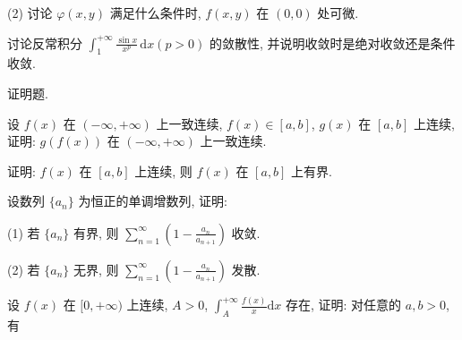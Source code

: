 (2) 讨论 $\varphi(x, y)$ 满足什么条件时, $f(x, y)$ 在 $(0, 0)$ 处可微.\par
讨论反常积分 $\int_{1}^{+\infty} \frac{\sin x}{x^p} \, \mathrm{d}x (p > 0)$ 的敛散性, 并说明收敛时是绝对收敛还是条件收敛.\par
\par{}
证明题.\par
设 $f(x)$ 在 $(- \infty, +\infty)$ 上一致连续, $f(x) \in [a, b]$, $g(x)$ 在 $[a, b]$ 上连续, 证明: $g(f(x))$ 在 $(- \infty, +\infty)$ 上一致连续.\par
证明: $f(x)$ 在 $[a, b]$ 上连续, 则 $f(x)$ 在 $[a, b]$ 上有界.\par
设数列 $\{a_{n}\}$ 为恒正的单调增数列, 证明:\par
(1) 若 $\{a_{n}\}$ 有界, 则 $\sum_{n=1}^{\infty}\left(1 - \frac{a_n}{a_{n+1}}\right)$ 收敛.\par
(2) 若 $\{a_{n}\}$ 无界, 则 $\sum_{n=1}^{\infty}\left(1 - \frac{a_n}{a_{n+1}}\right)$ 发散.\par
\par{}
设 $f(x)$ 在 $[0, +\infty)$ 上连续, $A > 0$, $\int_{A}^{+\infty} \frac{f(x)}{x} \mathrm{d}x$ 存在, 证明: 对任意的 $a, b > 0$, 有\par
\nopagebreak[4]
